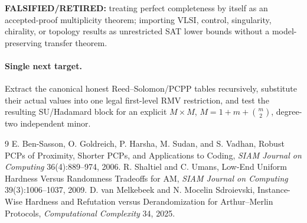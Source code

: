 \documentclass[11pt]{article}
\begin{document}
\textbf{FALSIFIED/RETIRED:} treating perfect completeness by itself as an accepted-proof multiplicity theorem; importing VLSI, control, singularity, chirality, or topology results as unrestricted SAT lower bounds without a model-preserving transfer theorem.

\paragraph{Single next target.}
Extract the canonical honest Reed--Solomon/PCPP tables recursively, substitute their actual values into one legal first-level RMV restriction, and test the resulting SU/Hadamard block for an explicit $M\times M$, $M=1+m+\binom m2$, degree-two independent minor.

\begin{thebibliography}{9}
 E. Ben-Sasson, O. Goldreich, P. Harsha, M. Sudan, and S. Vadhan, Robust PCPs of Proximity, Shorter PCPs, and Applications to Coding, \emph{SIAM Journal on Computing} 36(4):889--974, 2006.
 R. Shaltiel and C. Umans, Low-End Uniform Hardness Versus Randomness Tradeoffs for AM, \emph{SIAM Journal on Computing} 39(3):1006--1037, 2009.
 D. van Melkebeek and N. Mocelin Sdroievski, Instance-Wise Hardness and Refutation versus Derandomization for Arthur--Merlin Protocols, \emph{Computational Complexity} 34, 2025.
\end{thebibliography}
\end{document}
